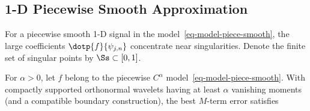 \subsection{1-D Piecewise Smooth Approximation}

For a piecewise smooth 1-D signal in the model~\eqref{eq-model-piece-smooth}, the large coefficients $\dotp{f}{\psi_{j,n}}$ concentrate near singularities. Denote the finite set of singular points by $\Ss \subset [0,1]$.


\begin{thm}\label{thm-approx-piecesmooth-1d}
For $\alpha>0$, let $f$ belong to the piecewise $C^\alpha$ model~\eqref{eq-model-piece-smooth}. With compactly supported orthonormal wavelets having at least $\alpha$ vanishing moments (and a compatible boundary construction), the best $M$-term error satisfies
\end{thm}

